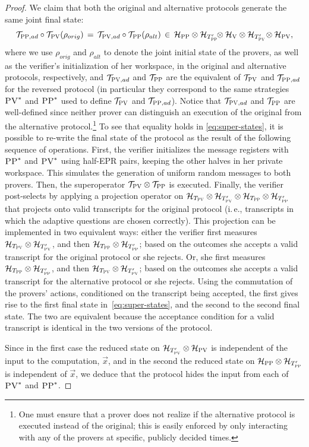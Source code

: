 \documentclass[11pt]{article}
\numberwithin{equation}{section}
\theoremstyle{definition}
\theoremstyle{plain}
\newcommand{\ie}{i.\,e.}
\newcommand{\mH}{\mathcal{H}}
\newcommand{\mT}{\mathcal{T}}
\newcommand{\ver}{\textsc{V}}
\newcommand{\pv}{\textsc{PV}}
\newcommand{\pp}{\textsc{PP}}
\begin{document}
\begin{proof}
We claim that both the original and alternative protocols generate the same joint final state:
\begin{equation}\label{eq:super-states}
\mT_{\pp,ad}\circ\mT_\pv(\rho_{orig}) \,=\, \mT_{\pv,ad}\circ \mT_\pp(\rho_{alt}) \,\in\,  \mH_{\pp}\otimes \mH_{T'_{\pp}}\!\! \otimes \mH_\ver \otimes \mH_{T'_\pv}\! \otimes \mH_\pv,
\end{equation}
where we use $\rho_{orig}$ and $\rho_{alt}$ to denote the joint initial state
of the provers, as well as the verifier's initialization of her workspace, in
the original and alternative protocols, %
 respectively, and $\mT_{\pv,ad}$ and $\mT_\pp$ are the equivalent of $\mT_\pv$ and $\mT_{\pp,ad}$ for the reversed protocol (in particular they correspond to the same strategies $\pv^*$ and $\pp^*$ used to define $\mT_\pv$ and  $\mT_{\pp,ad}$). Notice that $\mT_{\pv,ad}$ and $\mT_\pp$ are well-defined since neither prover can distinguish an execution of the original 
from 
the alternative protocol.\footnote{One must ensure that a prover does not realize if the  alternative protocol is executed instead of the original; this is easily enforced by only interacting with any of the provers at specific, publicly decided times.}
To see that 
equality holds in \eqref{eq:super-states},
it is possible to re-write the final state of the protocol as the
  result of the following sequence of operations. First, the verifier
  initializes the message registers with $\pp^*$ and $\pv^*$ using half-EPR
  pairs, keeping the other halves in her private workspace. This simulates the
  generation of 
uniform
random messages to both provers. Then, the
  superoperator $\mT_\pv \otimes \mT_\pp$ is executed. Finally, the verifier
  post-selects by applying a projection operator on $\mH_{T_\pv} \otimes \mH_{T'_\pv} \otimes \mH_{T_\pp} \otimes \mH_{T'_\pp}$ 
that 
projects onto valid transcripts for the
original protocol (\ie, transcripts in which the adaptive questions are chosen
correctly). This projection can be implemented in two equivalent ways: either
  the verifier first measures $ \mH_{T_\pv} \otimes \mH_{T'_\pv}$, and then
  $\mH_{T_\pp} \otimes \mH_{T'_\pp}$; based on the outcomes she accepts a valid transcript for the
  original protocol or she rejects. Or, she first measures $ \mH_{T_\pp} \otimes \mH_{T'_\pp}$, and then
  $\mH_{T_\pv} \otimes \mH_{T'_\pv}$; based on the outcomes she accepts a
  valid transcript for the alternative protocol or she rejects. Using the
  commutation of the provers' actions, conditioned on the transcript being
  accepted, the first gives rise to the first final state
  in~\eqref{eq:super-states}, and the second to the second final state. The two are equivalent because the acceptance condition for a valid transcript is identical in the two versions of the protocol.


Since in the first case the reduced state on $\mH_{T'_{\pv}} \otimes \mH_\pv$ is independent of the input to the computation, $\vec{x}$, and in the second  the reduced state on $ \mH_\pp\otimes \mH_{T'_{\pp}} $ is independent of $\vec{x}$, we deduce that the protocol hides the input from each of $\pv^*$ and $\pp^*$. 
\end{proof}
\end{document}
